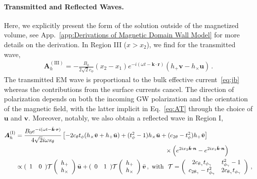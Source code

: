 \documentclass[a4paper,11pt]{article}
\begin{document}
\paragraph{Transmitted and Reflected Waves.}
Here, we explicitly present the form of the solution outside of the magnetized volume, see App.~\ref{app:Derivations of Magnetic Domain Wall Model} for more details on the derivation.
%
In Region III ($x>x_{2}$), we find for the transmitted wave,
%
\begin{align}
\label{eq:AT}
  {\bm A}_{h}^{(\text{III})} =
       -  \frac{B_{0}}{ 2\sqrt{2} c_{\phi}} (x_2 - x_1)
        e^{- i(  \omega t - {\bm k} \cdot {\bm r} )} \left( h_+  {\bm v} - h_\times {\bm u} \right)\,.
\end{align}
%
The transmitted EM wave is proportional to the bulk effective current~\eqref{eq:jb} whereas the contributions from the surface currents cancel.
%
The direction of polarization depends on both the incoming GW polarization and the orientation of the magnetic field, with the latter implicit in Eq.~\eqref{eq:AT} through the choice of ${\bm u}$ and ${\bm v}$. 
%
Moreover, notably, we also obtain a reflected wave in Region I,
%
\begin{equation}
\begin{aligned}
    \label{eq:AR}
         {\bm A}_{h}^{(\text{I})} &  =
           \frac{B_{0} e^{-i (\omega t- \bar{\bm k}\cdot  {\bm r}) }}{4 \sqrt{2} i \omega s_\theta}
            \left[- 2 c_\theta t_\phi( h_\times \bar{\bm v} +  h_+ \bar{\bm u}) 
           + (t_\phi^2 - 1) h_\times \bar{\bm u}  + (c_{2 \theta} - t_\phi^2) h_+ \bar{\bm v}  \right]    \\
           & \hspace{8.5cm}  \times \left( e^{2i x_2 \bar{\bm k}\cdot {\bm n}} -  e^{2i x_1 \bar{\bm k}\cdot {\bm n}} \right) \\
%
&\propto  
(
\begin{array}{cc}
 1 & 0 
\end{array})
{\cal T}
\left(
\begin{array}{c}
 h_+ \\ h_\times
\end{array}
\right)
\bar{\bm u}
+(
\begin{array}{cc}
 0 & 1
\end{array})
{\cal T}
\left(
\begin{array}{c}
 h_+ \\ h_\times
\end{array}
\right)\bar{\bm v}
\,, ~\text{with} ~~ {\cal T}  =\left(
\begin{array}{cc}
 2 c_{\theta_\gamma}t_{\phi_\gamma} & t_{\phi_\gamma}^2-1 \\
 c_{2 \theta_\gamma}-t_{\phi_\gamma}^2 & 2 c_{\theta_\gamma}t_{\phi_\gamma} \\
\end{array}
\right)  \,,
\end{aligned}
\end{equation}
\end{document}
